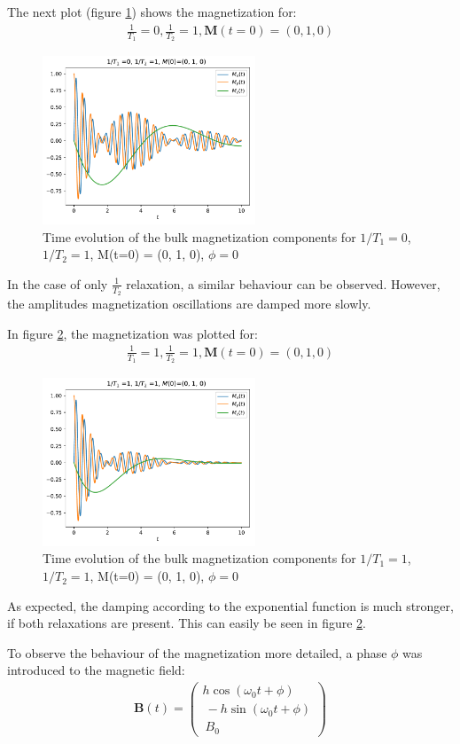\documentclass[journal]{IEEEtran} %
\begin{document}
The next plot (figure \ref{f2}) shows the magnetization for:
\begin{align}
    \frac{1}{T_1} = 0, \frac{1}{T_2} = 1, \mathbf{M}(t=0) = (0, 1, 0)
\end{align}
\begin{figure}[H]
\centering
\includegraphics[width=2.5in]{figs/NMR_T1-0_T2-1_Minit-010_tau_0.01_t_10_no_phase.pdf}
\caption{Time evolution of the bulk magnetization components for $1/T_1 = 0$, $1/T_2 = 1$, M(t=0) = (0, 1, 0), $\phi = 0$}
\label{f2}
\end{figure}
In the case of only $\frac{1}{T_2}$ relaxation, a similar behaviour can be observed. However, the amplitudes magnetization oscillations are damped more slowly. 


In figure \ref{f3}, the magnetization was plotted for:
\begin{align}
    \frac{1}{T_1} = 1, \frac{1}{T_2} = 1, \mathbf{M}(t=0) = (0, 1, 0)
\end{align}
\begin{figure}[H]
\centering
\includegraphics[width=2.5in]{figs/NMR_T1-1_T2-1_Minit-010_tau_0.01_t_10_no_phase.pdf}
\caption{Time evolution of the bulk magnetization components for $1/T_1 = 1$, $1/T_2 = 1$, M(t=0) = (0, 1, 0), $\phi = 0$}
\label{f3}
\end{figure}
As expected, the damping according to the exponential function is much stronger, if both relaxations are present. This can easily be seen in figure \ref{f3}.


To observe the behaviour of the magnetization more detailed, a phase $\phi$ was introduced to the magnetic field:
\begin{align}
\mathbf{B}(t) = \begin{pmatrix}h \cos(\omega_0 t + \phi) \\\ -h \sin(\omega_0 t + \phi) \\\ B_0 \end{pmatrix}    
\end{align}
\end{document}
